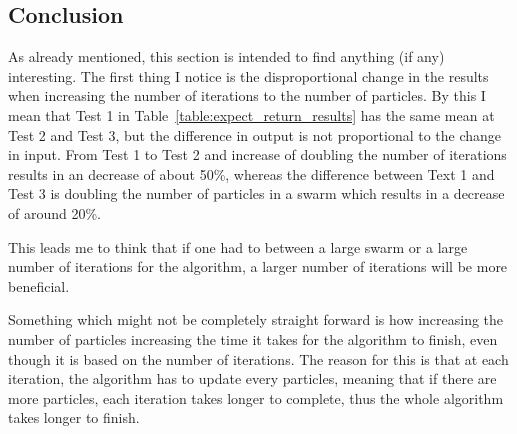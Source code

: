 \documentclass{pdfmx4020}
\begin{document}
    \subsection{Conclusion} %
    \label{sub:conclusion}
      As already mentioned, this section is intended to find anything (if any) interesting. The first thing I notice is the disproportional change in the results when increasing the number of iterations to the number of particles. By this I mean that Test 1 in Table~\ref{table:expect_return_results} has the same mean at Test 2 and Test 3, but the difference in output is not proportional to the change in input. From Test 1 to Test 2 and increase of doubling the number of iterations results in an decrease of about 50\%, whereas the difference between Text 1 and Test 3 is doubling the number of particles in a swarm which results in a decrease of around 20\%. 

      This leads me to think that if one had to between a large swarm or a large number of iterations for the algorithm, a larger number of iterations will be more beneficial. 

      Something which might not be completely straight forward is how increasing the number of particles increasing the time it takes for the algorithm to finish, even though it is based on the number of iterations. The reason for this is that at each iteration, the algorithm has to update every particles, meaning that if there are more particles, each iteration takes longer to complete, thus the whole algorithm takes longer to finish.




\end{document}
